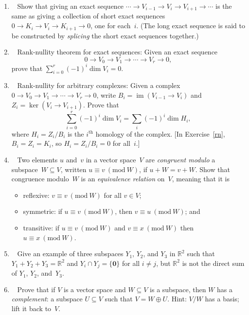 \documentclass[11pt]{article}
\newcommand\score[1]{\marginpar{\vspace{-2ex}\color{blue}{#1/3}}\hspace{-1ex}}
\newcommand\0{\mathbf{0}}
\newcommand\RR{\mathbb{R}}
\newcommand\<{\langle}
\renewcommand\>{\rangle}
\renewcommand\mod[1]{\ (\mathrm{mod}\ #1)}
\DeclareMathOperator\im{im}
\begin{document}
\begin{enumerate}
\item\ \score{}%
Show that giving an exact sequence $\cdots \to V_{i-1} \to V_i \to
V_{i+1} \to \cdots$ is the same as giving a collection of short exact
sequences $0 \to K_i \to V_i \to K_{i+1} \to 0$, one for each~$i$.
(The long exact sequence is said to be constructed by \emph{splicing}
the short exact sequences together.)

\item\ \score{}\label{rn}%
Rank-nullity theorem for exact sequences: Given an exact sequence
$$%
  0 \to V_0 \to V_1 \to \cdots \to V_r \to 0,
$$%
prove that $\sum_{i=0}^r (-1)^i \dim V_i = 0$.

\item\ \score{}%
Rank-nullity for arbitrary complexes: Given a complex $0 \to V_0 \to
V_1 \to \cdots \to V_r \to 0$, write $B_i = \im(V_{i-1} \to V_i)$ and
$Z_i = \ker(V_i \to V_{i+1})$.  Prove that
$$%
  \sum_{i=0}^r (-1)^i \dim V_i = \sum_i (-1)^i \dim H_i,
$$%
where $H_i = Z_i/B_i$ is the $i^\text{th}$ homology of the complex.
[In Exercise~\ref{rn}, $B_i = Z_i = K_i$, so $H_i = Z_i/B_i = 0$ for
all~$i$.]

\item\ \score{}%
Two elements $u$ and~$v$ in a vector space~$V$ are \emph{congruent
modulo} a subspace~$W \subseteq V$, written $u \equiv v \mod W$, if $u
+ W = v + W$.  Show that congruence modulo~$W$ is an \emph{equivalence
relation} on~$V$, meaning that it is
\begin{itemize}
\item
reflexive: $v \equiv v \mod W$ for all $v \in V$;
\item
symmetric: if $u \equiv v \mod W$, then $v \equiv u \mod W$; and
\item
transitive: if $u \equiv v \mod W$ and $v \equiv x \mod W$ then $u
\equiv x \mod W$.
\end{itemize}

\item\ \score{}%
Give an example of three subspaces $Y_1$, $Y_2$, and $Y_3$ in $\RR^2$
such that $Y_1 + Y_2 + Y_3 = \RR^2$ and $Y_i \cap Y_j = \{\0\}$ for
all $i \neq j$, but $\RR^2$ is not the direct sum of $Y_1$, $Y_2$,
and~$Y_3$.

\item\ \score{}%
Prove that if $V$ is a vector space and $W \subseteq V$ is a subspace,
then $W$ has a \emph{complement}: a subspace $U \subseteq V$ such that
$V = W \oplus U$.  Hint: $V/W$ has a basis; lift it back to~$V$.


\end{enumerate}
\end{document}
